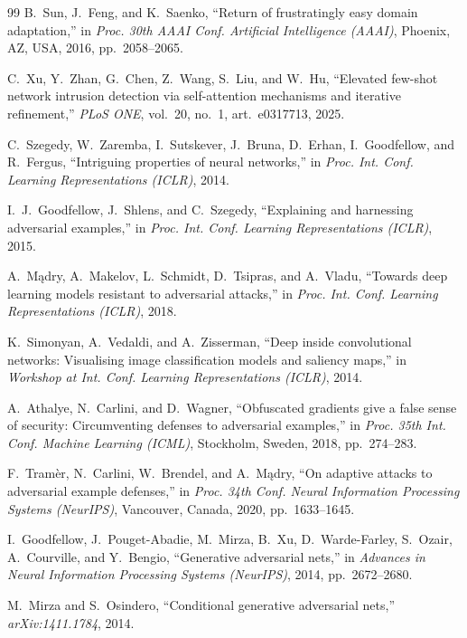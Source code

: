 \documentclass[11pt,a4paper]{article}
\begin{document}
\begin{thebibliography}{99}
 B.~Sun, J.~Feng, and K.~Saenko, ``Return of frustratingly easy
domain adaptation,'' in \emph{Proc. 30th AAAI Conf. Artificial Intelligence
(AAAI)}, Phoenix, AZ, USA, 2016, pp.~2058--2065.

 C.~Xu, Y.~Zhan, G.~Chen, Z.~Wang, S.~Liu, and W.~Hu,
``Elevated few-shot network intrusion detection via self-attention mechanisms
and iterative refinement,'' \emph{PLoS ONE}, vol.~20, no.~1, art.~e0317713, 2025.

 C.~Szegedy, W.~Zaremba, I.~Sutskever, J.~Bruna, D.~Erhan,
I.~Goodfellow, and R.~Fergus, ``Intriguing properties of neural networks,'' in
\emph{Proc. Int. Conf. Learning Representations (ICLR)}, 2014.

 I.~J.~Goodfellow, J.~Shlens, and C.~Szegedy, ``Explaining and
harnessing adversarial examples,'' in \emph{Proc. Int. Conf. Learning
Representations (ICLR)}, 2015.

 A.~M\k{a}dry, A.~Makelov, L.~Schmidt, D.~Tsipras, and A.~Vladu,
``Towards deep learning models resistant to adversarial attacks,'' in \emph{Proc.
Int. Conf. Learning Representations (ICLR)}, 2018.

 K.~Simonyan, A.~Vedaldi, and A.~Zisserman, ``Deep inside
convolutional networks: Visualising image classification models and saliency
maps,'' in \emph{Workshop at Int. Conf. Learning Representations (ICLR)}, 2014.

 A.~Athalye, N.~Carlini, and D.~Wagner, ``Obfuscated
gradients give a false sense of security: Circumventing defenses to adversarial
examples,'' in \emph{Proc. 35th Int. Conf. Machine Learning (ICML)}, Stockholm,
Sweden, 2018, pp.~274--283.

 F.~Tram\`er, N.~Carlini, W.~Brendel, and A.~M\k{a}dry, ``On
adaptive attacks to adversarial example defenses,'' in \emph{Proc. 34th Conf.
Neural Information Processing Systems (NeurIPS)}, Vancouver, Canada, 2020,
pp.~1633--1645.

 I.~Goodfellow, J.~Pouget-Abadie, M.~Mirza, B.~Xu, D.~Warde-Farley,
S.~Ozair, A.~Courville, and Y.~Bengio, ``Generative adversarial nets,'' in
\emph{Advances in Neural Information Processing Systems (NeurIPS)}, 2014,
pp.~2672--2680.

 M.~Mirza and S.~Osindero, ``Conditional generative adversarial
nets,'' \emph{arXiv:1411.1784}, 2014.


\end{thebibliography}
\end{document}
